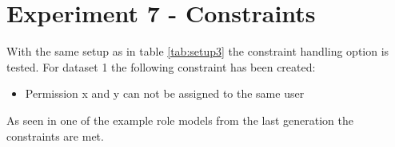 \newpage
\section{Experiment 7 - Constraints}
\label{sec:exp7}
With the same setup as in table \ref{tab:setup3} the constraint handling option is tested. For dataset 1 the following constraint has been created:

\begin{itemize}
    \item Permission x and y can not be assigned to the same user
\end{itemize}

As seen in one of the example role models from the last generation the constraints are met.


